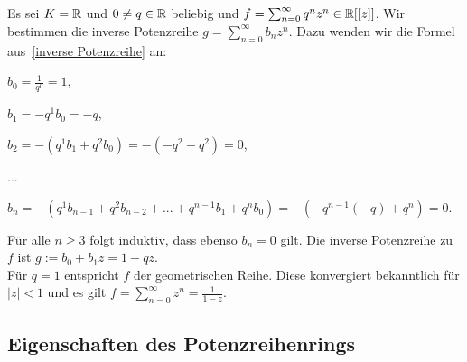 %
\begin{bsp} %
Es sei $K = \mathbb{R}$ und $0\neq q \in \mathbb{R}$ beliebig und $f = \sum_{n=0}^{\infty}q^n z^n \in \mathbb{R}[[z]]$. Wir bestimmen die inverse Potenzreihe $g = \sum_{n = 0}^{\infty} b_n z^n$. Dazu wenden wir die Formel aus~\ref{inverse Potenzreihe} an:
\begin{center}
\begin{description}
\item $b_0 = \frac{1}{q^0} = 1$,
\item $b_1 = -q^1b_0 = -q$,
\item $b_2 = -\left(q^1b_1 + q^2b_0\right) = -\left(-q^2 + q^2\right) = 0$,
\item ...
\item $b_n = -\left(q^1b_{n-1} + q^2b_{n-2} + ... + q^{n-1}b_1 + q^nb_0\right) = -\left(-q^{n-1}(-q) + q^n\right) = 0$.
\end{description}
\end{center}
Für alle $n \ge 3$ folgt induktiv, dass ebenso $b_n = 0$ gilt. Die inverse Potenzreihe zu $f$ ist $g := b_0 + b_1z = 1 - qz$. \\
Für $q = 1$ entspricht $f$ der geometrischen Reihe. Diese konvergiert bekanntlich für $|z| < 1$ und es gilt $f = \sum_{n= 0}^{\infty} z^n = \frac{1}{1-z}$.
\end{bsp}
%
%
%
%
%
%
%
%
%
%
\subsection{Eigenschaften des Potenzreihenrings}

